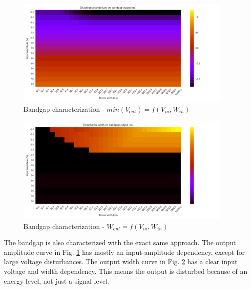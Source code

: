\begin{figure}[!htb]
  \centering
  \includegraphics[width=0.95\textwidth]{src/4/figures/bandgap_cz_V2_amplitude.png}
  \caption{Bandgap characterization - $min(V_{out}) = f(V_{in}, W_{in})$}
  \label{fig:bandgap-cz-v2-amp}
\end{figure}

\begin{figure}[!htb]
  \centering
  \includegraphics[width=0.95\textwidth]{src/4/figures/bandgap_cz_V2_width.png}
  \caption{Bandgap characterization - $W_{out} = f(V_{in}, W_{in})$}
  \label{fig:bandgap-cz-v2-width}
\end{figure}

The bandgap is also characterized with the exact same approach.
The output amplitude curve in Fig. \ref{fig:bandgap-cz-v2-amp} has mostly an input-amplitude dependency, except for large voltage disturbances.
The output width curve in Fig. \ref{fig:bandgap-cz-v2-width} has a clear input voltage and width dependency.
This means the output is disturbed because of an energy level, not just a signal level.

